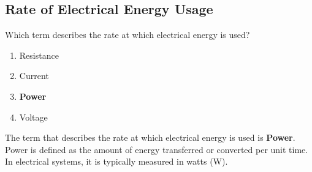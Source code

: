 \subsection{Rate of Electrical Energy Usage}
\label{T5A10}

\begin{tcolorbox}[colback=gray!10!white,colframe=black!75!black,title=T5A10]
Which term describes the rate at which electrical energy is used?
\begin{enumerate}[noitemsep]
    \item Resistance
    \item Current
    \item \textbf{Power}
    \item Voltage
\end{enumerate}
\end{tcolorbox}

The term that describes the rate at which electrical energy is used is \textbf{Power}. Power is defined as the amount of energy transferred or converted per unit time. In electrical systems, it is typically measured in watts (W).
